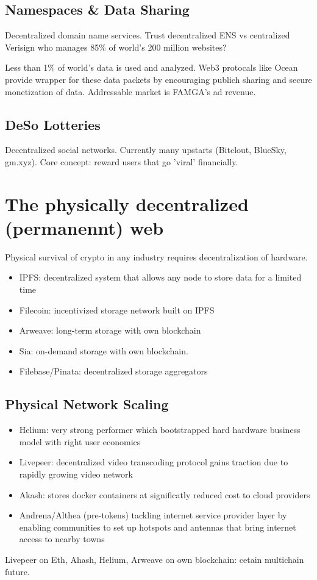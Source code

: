 \documentclass{../notes}
\begin{document}
\subsection{Namespaces \& Data Sharing}
Decentralized domain name services. Trust decentralized ENS vs centralized Verisign who manages 85\% of world's 200 million websites?

Less than 1\% of world's data is used and analyzed. Web3 protocals like Ocean provide wrapper for these data packets by encouraging publich sharing and secure monetization of data. Addressable market is FAMGA's ad revenue. 

\subsection{DeSo Lotteries}
Decentralized social networks. Currently many upstarts (Bitclout, BlueSky, gm.xyz). Core concept: reward users that go 'viral' financially. 

\section{The physically decentralized (permanennt) web}
Physical survival of crypto in any industry requires decentralization of hardware. 
\begin{itemize}
    \item IPFS: decentralized system that allows any node to store data for a limited time
    \item Filecoin: incentivized storage network built on IPFS
    \item Arweave: long-term storage with own blockchain
    \item Sia: on-demand storage with own blockchain. 
    \item Filebase/Pinata: decentralized storage aggregators
\end{itemize}

\subsection{Physical Network Scaling}
\begin{itemize}
    \item Helium: very strong performer which bootstrapped hard hardware business model with right user economics
    \item Livepeer: decentralized video transcoding protocol gains traction due to rapidly growing video network
    \item Akash: stores docker containers at significatly reduced cost to cloud providers
    \item Andrena/Althea (pre-tokens) tackling internet service provider layer by enabling communities to set up hotspots and antennas that bring internet access to nearby towns
\end{itemize}
Livepeer on Eth, Ahash, Helium, Arweave on own blockchain: cetain multichain future.
\end{document}
